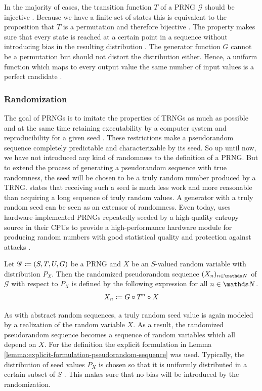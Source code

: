 \documentclass{stdlocal}
\begin{document}
    In the majority of cases, the transition function $T$ of a PRNG $\mathscr{G}$ should be injective \autocite{lecuyer1994,lecuyer2015,widynski2019,oneill2014}.
    Because we have a finite set of states this is equivalent to the proposition that $T$ is a permutation and therefore bijective \autocite[\ppno~201-202]{waldmann2017}.
    The property makes sure that every state is reached at a certain point in a sequence without introducing bias in the resulting distribution \autocite{oneill2014}.
    The generator function $G$ cannot be a permutation but should not distort the distribution either.
    Hence, a uniform function which maps to every output value the same number of input values is a perfect candidate \autocite{oneill2014}.

    \subsubsection{Randomization}
    The goal of PRNGs is to imitate the properties of TRNGs as much as possible \autocite{lecuyer1994} and at the same time retaining executability by a computer system and reproducibility for a given seed \autocite{lecuyer2015}.
    These restrictions make a pseudorandom sequence completely predictable and characterizable by its seed.
    So up until now, we have not introduced any kind of randomness to the definition of a PRNG.
    But to extend the process of generating a pseudorandom sequence with true randomness, the seed will be chosen to be a truly random number produced by a TRNG.
    \textcite{lecuyer1994} states that receiving such a seed is much less work and more reasonable than acquiring a long sequence of truly random values.
    A generator with a truly random seed can be seen as an extensor of randomness.
    Even today, \citeauthor{intel-drng} uses hardware-implemented PRNGs repeatedly seeded by a high-quality entropy source in their CPUs to provide a high-performance hardware module for producing random numbers with good statistical quality and protection against attacks \autocite{intel-drng}.

    \begin{definition}
      Let $\mathscr{G}\coloneqq (S,T,U,G)$ be a PRNG and $X$ be an $S$-valued random variable with distribution $P_X$.
      Then the randomized pseudorandom sequence $(X_n)_{n\in\setNatural}$ of $\mathscr{G}$ with respect to $P_X$ is defined by the following expression for all $n\in\setNatural$.
      \[
        X_n \coloneqq G \circ T^n \circ X
      \]
    \end{definition}
    As with abstract random sequences, a truly random seed value is again modeled by a realization of the random variable $X$.
    As a result, the randomized pseudorandom sequence becomes a sequence of random variables which all depend on $X$.
    For the definition the explicit formulation in Lemma \ref{lemma:explicit-formulation-pseudorandom-sequence} was used.
    Typically, the distribution of seed values $P_X$ is chosen so that it is uniformly distributed in a certain subset of $S$ \autocite{matsumoto1998,oneill2014,lecuyer1994,lecuyer2015,bauke2007}.
    This makes sure that no bias will be introduced by the randomization.
\end{document}
